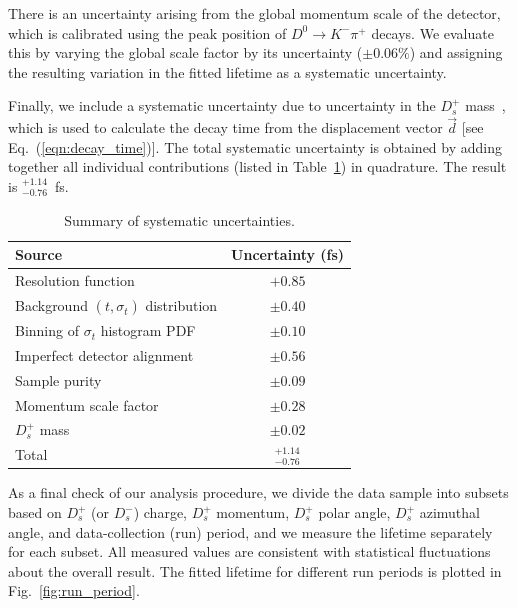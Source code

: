 \documentclass[aps,prl,twocolumn,superscriptaddress,showpacs,preprintnumbers,amsmath,amssymb]{revtex4-2}
\def\ra{\!\rightarrow\!}
\def\sigmat{\sigma^{}_t}
\def\trec {t}
\begin{document}
There is an uncertainty arising from the global momentum scale of the detector,
which is calibrated using the peak position of $D^0\ra K^-\pi^+$ decays.
We evaluate this by varying the global scale factor by its uncertainty 
($\pm 0.06\%$) and assigning the resulting variation in the fitted 
lifetime as a systematic uncertainty.

Finally, we include a systematic uncertainty due to uncertainty in the 
$D_s^+$ mass~\cite{ParticleDataGroup:2022pth}, which is used to calculate 
the decay time from the displacement vector $\vec{d}$ [see Eq.~(\ref{eqn:decay_time})].
The total systematic uncertainty is obtained by adding together all individual 
contributions (listed in Table~\ref{tab:syst_summary}) in quadrature. 
The result is $^{+1.14}_{-0.76}$~fs.

\begin{table}[ht]
\renewcommand{\arraystretch}{1.2}
\begin{tabular}{lc} 
\hline \hline
Source                                   & Uncertainty (fs)   \\ 
\hline    
Resolution function                      &   $+ 0.85$       \\
Background $(\trec,\sigma^{}_t)$ distribution  &  $\pm 0.40$       \\
Binning of $\sigmat$ histogram PDF      &   $\pm 0.10$       \\
Imperfect detector alignment             &  $\pm 0.56$       \\
Sample purity                            &   $\pm 0.09$       \\
Momentum scale factor                    &   $\pm 0.28$       \\
$D^+_s$ mass                             &   $\pm 0.02$       \\ \hline
Total                                    &   $^{+1.14}_{-0.76}$ \\ 
\hline \hline 
\end{tabular}
\caption{Summary of systematic uncertainties.}
\label{tab:syst_summary}
\end{table}


As a final check of our analysis procedure, we divide the data 
sample into subsets based on $D_s^+$ (or $D_s^-$) charge, 
$D_s^+$ momentum, $D_s^+$ polar angle, $D_s^+$ azimuthal 
angle, and data-collection (run) period, and we measure the 
lifetime separately for each subset. All measured values are 
consistent with statistical fluctuations about the overall result.
The fitted lifetime for different run periods is plotted in Fig.~\ref{fig:run_period}.
\end{document}
